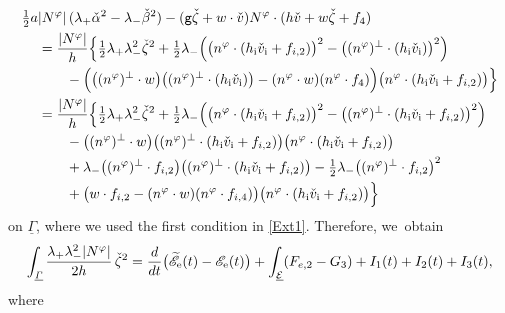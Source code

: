 \documentclass[11pt]{article}
\newcommand{\gr}{{\mathtt g}}
\newcommand{\cE}{{\mathcal E}}
\newcommand{\ul}[1]{\underline{#1}}
\newcommand{\itGamma}{\mathit{\Gamma}}
\theoremstyle{definition}
\begin{document}
\begin{align*}
\tfrac12a&|N^\varphi|\,(\lambda_+\check{\alpha}^2-\lambda_-\check{\beta}^2)
- (\gr\check{\zeta}+w\cdot\check{v})N^\varphi\cdot(h\check{v}+w\check{\zeta}+f_4) \\
&= \frac{|N^\varphi|}{h}\Bigl\{ \tfrac12\lambda_+\lambda_-^2\check{\zeta}^2
+ \tfrac12\lambda_-\Bigl(\bigl(n^\varphi\cdot(h_\mathrm{i}\check{v}_\mathrm{i}+f_{{\rm i},2}) \bigr)^2 - \bigl((n^\varphi)^\perp\cdot(h_\mathrm{i}\check{v}_\mathrm{i}) \bigr)^2 \Bigr) \\
&\qquad
- \Bigl(\bigl((n^\varphi)^\perp\cdot w \bigr) \bigl((n^\varphi)^\perp\cdot(h_\mathrm{i}\check{v}_\mathrm{i}) \bigr)
- (n^\varphi\cdot w)(n^\varphi\cdot f_4) \Bigr) \bigl(n^\varphi\cdot(h_\mathrm{i}\check{v}_\mathrm{i}+f_{{\rm i},2}) \bigr) \Bigr\} \\
&= \frac{|N^\varphi|}{h}\Bigl\{ \tfrac12\lambda_+\lambda_-^2\check{\zeta}^2
+ \tfrac12\lambda_-\Bigl(\bigl(n^\varphi\cdot(h_\mathrm{i}\check{v}_\mathrm{i}+f_{{\rm i},2}) \bigr)^2
- \bigl((n^\varphi)^\perp\cdot(h_\mathrm{i}\check{v}_\mathrm{i}+f_{{\rm i},2}) \bigr)^2 \Bigr) \\
&\qquad
- \bigl((n^\varphi)^\perp\cdot w \bigr) \bigl((n^\varphi)^\perp\cdot(h_\mathrm{i}\check{v}_\mathrm{i}+f_{{\rm i},2}) \bigr) \bigl(n^\varphi\cdot(h_\mathrm{i}\check{v}_\mathrm{i}+f_{{\rm i},2}) \bigr) \\
&\qquad
+ \lambda_- \bigl((n^\varphi)^\perp\cdot f_{{\rm i},2} \bigr) \bigl((n^\varphi)^\perp\cdot(h_\mathrm{i}\check{v}_\mathrm{i}+f_{{\rm i},2}) \bigr)
- \tfrac12\lambda_- \bigl((n^\varphi)^\perp\cdot f_{{\rm i},2} \bigr)^2 \\
&\qquad
+ \bigl(w\cdot f_{{\rm i},2} - (n^\varphi\cdot w)(n^\varphi\cdot f_{{\rm i},4}) \bigr) \bigl(n^\varphi\cdot(h_\mathrm{i}\check{v}_\mathrm{i}+f_{{\rm i},2}) \bigr) \Bigr\}
\end{align*}
on $\ul{\itGamma}$, where we used the first condition in \eqref{Ext1}.
Therefore, we~obtain
\begin{equation}\label{EqCF6}
\int_{\ul{\itGamma}}\frac{\lambda_+\lambda_-^2|N^\varphi|}{2h}\,\check{\zeta}^2
= \frac{\rm d}{{\rm d}t} \bigl(\widetilde{\mathscr{E}}_\mathrm{e}(t)-\mathscr{E}_\mathrm{e}(t) \bigr) + \int_{\ul{\cE}}(F_{{\rm e},2}-G_3) + I_1(t) + I_2(t) + I_3(t),
\end{equation}
where
\end{document}
